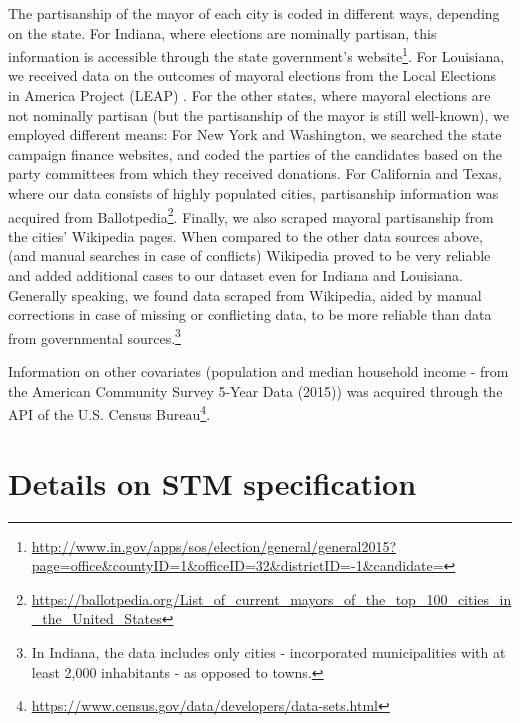 \documentclass[11pt]{article}
\begin{document}
The partisanship of the mayor of each city is coded in different ways, depending on the state. For Indiana, where elections are nominally partisan, this information is accessible through the state government's website\footnote{\url{http://www.in.gov/apps/sos/election/general/general2015?page=office&countyID=1&officeID=32&districtID=-1&candidate=}}. For Louisiana, we received data on the outcomes of mayoral elections from the Local Elections in America Project (LEAP) \citep{marschall2013local}. For the other states, where mayoral elections are not nominally partisan (but the partisanship of the mayor is still well-known), we employed different means: For New York and Washington, we searched the state campaign finance websites, and coded the parties of the candidates based on the party committees from which they received donations. For California and Texas, where our data consists of highly populated cities, partisanship information was acquired from Ballotpedia\footnote{\url{https://ballotpedia.org/List_of_current_mayors_of_the_top_100_cities_in_the_United_States}}. Finally, we also scraped mayoral partisanship from the cities' Wikipedia pages. When compared to the other data sources above, (and manual searches in case of conflicts) Wikipedia proved to be very reliable and added additional cases to our dataset even for Indiana and Louisiana. Generally speaking, we found data scraped from Wikipedia, aided by manual corrections in case of missing or conflicting data, to be more reliable than data from governmental sources.\footnote{In Indiana, the data includes only cities - incorporated municipalities with at least 2,000 inhabitants - as opposed to towns.}


Information on other covariates (population and median household income - from the American Community Survey 5-Year Data (2015)) was acquired through the API of the U.S. Census Bureau\footnote{\url{https://www.census.gov/data/developers/data-sets.html}}.


\section*{Details on STM specification}
\end{document}

